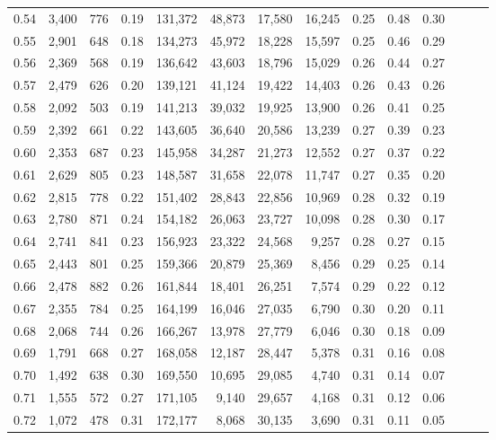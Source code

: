 \begin{tabular}{rrrrrrrrrrrrrr}
0.54 &  3,400 &  776 &  0.19 &  131,372 &   48,873 &  17,580 &  16,245 &  0.25 &  0.48 &      0.30 \\
0.55 &  2,901 &  648 &  0.18 &  134,273 &   45,972 &  18,228 &  15,597 &  0.25 &  0.46 &      0.29 \\
0.56 &  2,369 &  568 &  0.19 &  136,642 &   43,603 &  18,796 &  15,029 &  0.26 &  0.44 &      0.27 \\
0.57 &  2,479 &  626 &  0.20 &  139,121 &   41,124 &  19,422 &  14,403 &  0.26 &  0.43 &      0.26 \\
0.58 &  2,092 &  503 &  0.19 &  141,213 &   39,032 &  19,925 &  13,900 &  0.26 &  0.41 &      0.25 \\
0.59 &  2,392 &  661 &  0.22 &  143,605 &   36,640 &  20,586 &  13,239 &  0.27 &  0.39 &      0.23 \\
0.60 &  2,353 &  687 &  0.23 &  145,958 &   34,287 &  21,273 &  12,552 &  0.27 &  0.37 &      0.22 \\
0.61 &  2,629 &  805 &  0.23 &  148,587 &   31,658 &  22,078 &  11,747 &  0.27 &  0.35 &      0.20 \\
0.62 &  2,815 &  778 &  0.22 &  151,402 &   28,843 &  22,856 &  10,969 &  0.28 &  0.32 &      0.19 \\
0.63 &  2,780 &  871 &  0.24 &  154,182 &   26,063 &  23,727 &  10,098 &  0.28 &  0.30 &      0.17 \\
0.64 &  2,741 &  841 &  0.23 &  156,923 &   23,322 &  24,568 &   9,257 &  0.28 &  0.27 &      0.15 \\
0.65 &  2,443 &  801 &  0.25 &  159,366 &   20,879 &  25,369 &   8,456 &  0.29 &  0.25 &      0.14 \\
0.66 &  2,478 &  882 &  0.26 &  161,844 &   18,401 &  26,251 &   7,574 &  0.29 &  0.22 &      0.12 \\
0.67 &  2,355 &  784 &  0.25 &  164,199 &   16,046 &  27,035 &   6,790 &  0.30 &  0.20 &      0.11 \\
0.68 &  2,068 &  744 &  0.26 &  166,267 &   13,978 &  27,779 &   6,046 &  0.30 &  0.18 &      0.09 \\
0.69 &  1,791 &  668 &  0.27 &  168,058 &   12,187 &  28,447 &   5,378 &  0.31 &  0.16 &      0.08 \\
0.70 &  1,492 &  638 &  0.30 &  169,550 &   10,695 &  29,085 &   4,740 &  0.31 &  0.14 &      0.07 \\
0.71 &  1,555 &  572 &  0.27 &  171,105 &    9,140 &  29,657 &   4,168 &  0.31 &  0.12 &      0.06 \\
0.72 &  1,072 &  478 &  0.31 &  172,177 &    8,068 &  30,135 &   3,690 &  0.31 &  0.11 &      0.05 \\

\end{tabular}

